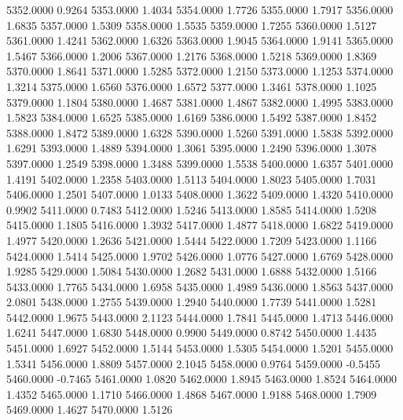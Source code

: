 5352.0000      0.9264
5353.0000      1.4034
5354.0000      1.7726
5355.0000      1.7917
5356.0000      1.6835
5357.0000      1.5309
5358.0000      1.5535
5359.0000      1.7255
5360.0000      1.5127
5361.0000      1.4241
5362.0000      1.6326
5363.0000      1.9045
5364.0000      1.9141
5365.0000      1.5467
5366.0000      1.2006
5367.0000      1.2176
5368.0000      1.5218
5369.0000      1.8369
5370.0000      1.8641
5371.0000      1.5285
5372.0000      1.2150
5373.0000      1.1253
5374.0000      1.3214
5375.0000      1.6560
5376.0000      1.6572
5377.0000      1.3461
5378.0000      1.1025
5379.0000      1.1804
5380.0000      1.4687
5381.0000      1.4867
5382.0000      1.4995
5383.0000      1.5823
5384.0000      1.6525
5385.0000      1.6169
5386.0000      1.5492
5387.0000      1.8452
5388.0000      1.8472
5389.0000      1.6328
5390.0000      1.5260
5391.0000      1.5838
5392.0000      1.6291
5393.0000      1.4889
5394.0000      1.3061
5395.0000      1.2490
5396.0000      1.3078
5397.0000      1.2549
5398.0000      1.3488
5399.0000      1.5538
5400.0000      1.6357
5401.0000      1.4191
5402.0000      1.2358
5403.0000      1.5113
5404.0000      1.8023
5405.0000      1.7031
5406.0000      1.2501
5407.0000      1.0133
5408.0000      1.3622
5409.0000      1.4320
5410.0000      0.9902
5411.0000      0.7483
5412.0000      1.5246
5413.0000      1.8585
5414.0000      1.5208
5415.0000      1.1805
5416.0000      1.3932
5417.0000      1.4877
5418.0000      1.6822
5419.0000      1.4977
5420.0000      1.2636
5421.0000      1.5444
5422.0000      1.7209
5423.0000      1.1166
5424.0000      1.5414
5425.0000      1.9702
5426.0000      1.0776
5427.0000      1.6769
5428.0000      1.9285
5429.0000      1.5084
5430.0000      1.2682
5431.0000      1.6888
5432.0000      1.5166
5433.0000      1.7765
5434.0000      1.6958
5435.0000      1.4989
5436.0000      1.8563
5437.0000      2.0801
5438.0000      1.2755
5439.0000      1.2940
5440.0000      1.7739
5441.0000      1.5281
5442.0000      1.9675
5443.0000      2.1123
5444.0000      1.7841
5445.0000      1.4713
5446.0000      1.6241
5447.0000      1.6830
5448.0000      0.9900
5449.0000      0.8742
5450.0000      1.4435
5451.0000      1.6927
5452.0000      1.5144
5453.0000      1.5305
5454.0000      1.5201
5455.0000      1.5341
5456.0000      1.8809
5457.0000      2.1045
5458.0000      0.9764
5459.0000     -0.5455
5460.0000     -0.7465
5461.0000      1.0820
5462.0000      1.8945
5463.0000      1.8524
5464.0000      1.4352
5465.0000      1.1710
5466.0000      1.4868
5467.0000      1.9188
5468.0000      1.7909
5469.0000      1.4627
5470.0000      1.5126
